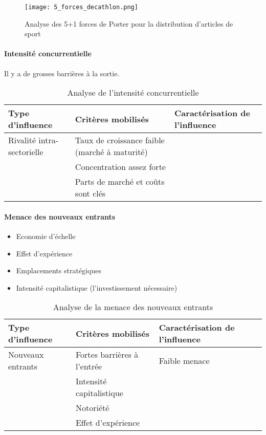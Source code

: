     \begin{figure}[H]
      \begin{center}
	\texttt{[image: 5\_forces\_decathlon.png]}
	\caption{Analyse des 5+1 forces de Porter pour la distribution d'articles de sport}
      \end{center}
    \end{figure}
    
    \paragraph{Intensité concurrentielle} Il y a de grosses barrières à la sortie.
    
    \begin{table}[!ht]
      \begin{center}
	\begin{tabular}{p{5cm}|p{5cm}|p{5cm}}
	  Type d'influence & Critères mobilisés & Caractérisation de l'influence \\ \hline
	  Rivalité intra-sectorielle  & Taux de croissance faible (marché à maturité) & \\
	  & Concentration assez forte & \\
	  & Parts de marché et coûts sont clés & \\
	\end{tabular}
	\caption{Analyse de l'intensité concurrentielle}
      \end{center}
    \end{table}
    
    \clearpage

    \paragraph{Menace des nouveaux entrants}
    
    \begin{itemize}
     \item Economie d'échelle
     \item Effet d'expérience
     \item Emplacements stratégiques
     \item Intensité capitalistique (l'investissement nécessaire)
    \end{itemize}
    
    \begin{table}[!ht]
      \begin{center}
	\begin{tabular}{p{3.5cm}|p{5cm}|p{5.5cm}}
	Type d'influence & Critères mobilisés & Caractérisation de l'influence \\ \hline
	  Nouveaux entrants & Fortes barrières à l'entrée & Faible menace \\
	  & Intensité capitalistique & \\
	  & Notoriété & \\
	  & Effet d'expérience & \\
	\end{tabular}
	\caption{Analyse de la menace des nouveaux entrants}
      \end{center}
    \end{table}
    

